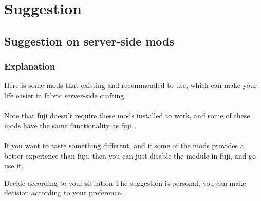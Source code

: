 \chapter{Suggestion}\label{ch:suggestion}


\section{Suggestion on server-side mods}

\subsection{Explanation}
Here is some mods that existing and recommended to use, which can make your life easier in fabric server-side crafting.
\\\\
Note that fuji doesn't require these mods installed to work, and some of these mods have the same functionality as fuji.
\\\\
If you want to taste something different, and if some of the mods provides a better experience than fuji, then you can just disable the module in fuji, and go use it.

\begin{tips}{Decide according to your situation}
    The suggestion is personal, you can make decision according to your preference.
\end{tips}

\clearpage

